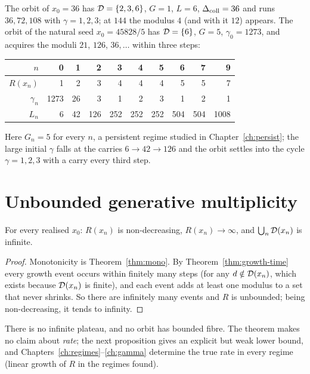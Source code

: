 \begin{example}\label{ex:orbit36}
The orbit of \(x_0=36\) has \(\mathcal{D}=\{2,3,6\}\), \(G=1\), \(L=6\), \(\Delta_{\mathrm{coll}}=36\) and runs \(36,72,108\) with \(\gamma=1,2,3\); at \(144\) the modulus \(4\) (and with it \(12\)) appears. The orbit of the natural seed \(x_0=45828/5\) has \(\mathcal{D}=\{6\}\), \(G=5\), \(\gamma_0=1273\), and acquires the moduli \(21\), \(126\), \(36,\dots\) within three steps:
\begin{center}\small
\begin{tabular}{r|rrrrrrrrr}
\(n\) & 0 & 1 & 2 & 3 & 4 & 5 & 6 & 7 & 9\\\hline
\(R(x_n)\) & 1 & 2 & 3 & 4 & 4 & 4 & 5 & 5 & 7\\
\(\gamma_n\) & 1273 & 26 & 3 & 1 & 2 & 3 & 1 & 2 & 1\\
\(L_n\) & 6 & 42 & 126 & 252 & 252 & 252 & 504 & 504 & 1008
\end{tabular}
\end{center}
Here \(G_n=5\) for every \(n\), a persistent regime studied in Chapter~\ref{ch:persist}; the large initial \(\gamma\) falls at the carries \(6\to42\to126\) and the orbit settles into the cycle \(\gamma=1,2,3\) with a carry every third step.
\end{example}

\section{Unbounded generative multiplicity}

\begin{theorem}\label{thm:growth}
For every realised \(x_0\): \(R(x_n)\) is non-decreasing, \(R(x_n)\to\infty\), and \(\bigcup_n\mathcal{D}(x_n)\) is infinite.
\end{theorem}
\begin{proof}
Monotonicity is Theorem~\ref{thm:mono}. By Theorem~\ref{thm:growth-time} every growth event occurs within finitely many steps (for any \(d\notin\mathcal{D}(x_n)\), which exists because \(\mathcal{D}(x_n)\) is finite), and each event adds at least one modulus to a set that never shrinks. So there are infinitely many events and \(R\) is unbounded; being non-decreasing, it tends to infinity.
\end{proof}

There is no infinite plateau, and no orbit has bounded fibre. The theorem makes no claim about \emph{rate}; the next proposition gives an explicit but weak lower bound, and Chapters~\ref{ch:regimes}--\ref{ch:gamma} determine the true rate in every regime (linear growth of \(R\) in the regimes found).

